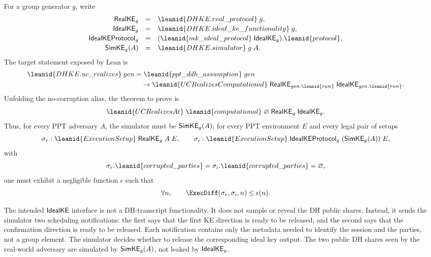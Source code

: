 \begin{definition}
For a group generator \(g\), write
\[
\begin{array}{rcl}
\RealKE_g
  &=&
  \leanid{DHKE.real\_protocol}\;g,\\[0.2em]
\IdealKE_g
  &=&
  \leanid{DHKE.ideal\_ke\_functionality}\;g,\\[0.2em]
\PhiKE_g
  &=&
  (\leanid{mk\_ideal\_protocol}\;\IdealKE_g).\leanid{protocol},\\[0.2em]
\SimKE_g(A)
  &=&
  \leanid{DHKE.simulator}\;g\;A .
\end{array}
\]
The target statement exposed by Lean is
\[
\begin{aligned}
  \leanid{DHKE.uc\_realizes}\;gen
  &=
  \leanid{ppt\_ddh\_assumption}\;gen\\
  &\quad\to
  \leanid{UCRealizesComputational}\;
    \RealKE_{gen.\leanid{run}}\;\IdealKE_{gen.\leanid{run}} .
\end{aligned}
\]
Unfolding the no-corruption alias, the theorem to prove is
\[
  \leanid{UCRealizesAt}\;
    \leanid{computational}\;\varnothing\;
    \RealKE_g\;\IdealKE_g .
\]
Thus, for every PPT adversary \(A\), the simulator must be
\(\mathsf{SimKE}_g(A)\); for every PPT environment \(E\) and every legal pair of
setups
\[
  \sigma_r:\leanid{ExecutionSetup}\;\RealKE_g\;A\;E,\qquad
  \sigma_i:\leanid{ExecutionSetup}\;\PhiKE_g\;(\SimKE_g(A))\;E,
\]
with
\[
  \sigma_r.\leanid{corrupted\_parties}
  =
  \sigma_i.\leanid{corrupted\_parties}
  =
  \varnothing ,
\]
one must exhibit a negligible function \(\epsilon\) such that
\[
  \forall n,\qquad
  \ExecDiff(\sigma_r,\sigma_i,n)\le \epsilon(n).
\]

The intended \(\mathsf{IdealKE}\) interface is not a DH-transcript functionality.
It does not sample or reveal the DH public shares.  Instead, it sends the
simulator two scheduling notifications: the first says that the first KE
direction is ready to be released, and the second says that the confirmation
direction is ready to be released.  Each notification contains only the
metadata needed to identify the session and the parties, not a group element.
The simulator decides whether to release the corresponding ideal key output.
The two public DH shares seen by the real-world adversary are simulated by
\(\mathsf{SimKE}_g(A)\), not leaked by \(\mathsf{IdealKE}_g\).
\end{definition}

